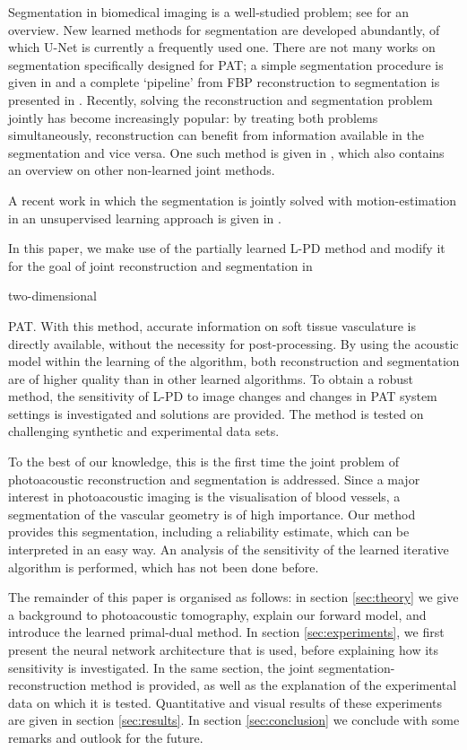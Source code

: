 \documentclass[journal]{IEEEtran}
\newcommand{\hl}[1]{\cbcolor{red}\begin{changebar}{#1}\end{changebar}}
\begin{document}
Segmentation in biomedical imaging is a well-studied problem; see \cite{Acton2009} for an overview. New learned methods for segmentation are developed abundantly, of which U-Net \cite{Ronneberger2015} is currently a frequently used one. There are not many works on segmentation specifically designed for PAT; a simple segmentation procedure is given in \cite{Soetikno2012} and a complete `pipeline' from FBP reconstruction to segmentation is presented in \cite{Raumonen2018}. Recently, solving the reconstruction and segmentation problem jointly has become increasingly popular: by treating both problems simultaneously, reconstruction can benefit from information available in the segmentation and vice versa. One such method is given in \cite{Corona2018}, which also contains an overview on other non-learned joint methods. \hl{A recent work in which the segmentation is jointly solved with motion-estimation in an unsupervised learning approach is given in \cite{Qin2018}.}

In this paper, we make use of the partially learned L-PD method and modify it for the goal of joint reconstruction and segmentation in \hl{two-dimensional} PAT. With this method, accurate information on soft tissue vasculature is directly available, without the necessity for post-processing. By using the acoustic model within the learning of the algorithm, both reconstruction and segmentation are of higher quality than in other learned algorithms. To obtain a robust method, the sensitivity of L-PD to image changes and changes in PAT system settings is investigated and solutions are provided. The method is tested on challenging synthetic and experimental data sets. 

To the best of our knowledge, this is the first time the joint problem of photoacoustic reconstruction and segmentation is addressed. Since a major interest in photoacoustic imaging is the visualisation of blood vessels, a segmentation of the vascular geometry is of high importance. Our method provides this segmentation, including a reliability estimate, which can be interpreted in an easy way. An analysis of the sensitivity of the learned iterative algorithm is performed, which has not been done before.

The remainder of this paper is organised as follows: in section \ref{sec:theory} we give a background to photoacoustic tomography, explain our forward model, and introduce the learned primal-dual method. In section \ref{sec:experiments}, we first present the neural network architecture that is used, before explaining how its sensitivity is investigated. In the same section, the joint segmentation-reconstruction method is provided, as well as the explanation of the experimental data on which it is tested. Quantitative and visual results of these experiments are given in section \ref{sec:results}. In section \ref{sec:conclusion} we conclude with some remarks and outlook for the future.
\end{document}
